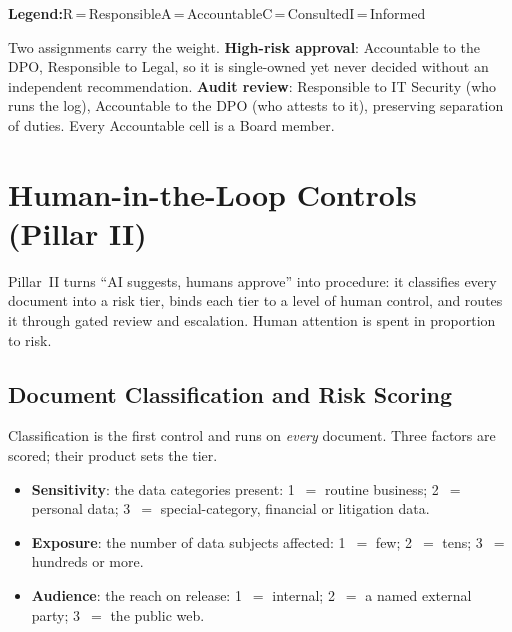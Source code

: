 \documentclass[12pt,a4paper]{article}
\begin{document}
\begin{tcolorbox}[
  enhanced, sharp corners, colback=white, colframe=gray!45, boxrule=0.5pt,
  left=8pt, right=8pt, top=5pt, bottom=5pt,
]
\textbf{Legend:}\quad R\,=\,Responsible\quad A\,=\,Accountable\quad C\,=\,Consulted\quad I\,=\,Informed
\end{tcolorbox}

Two assignments carry the weight. \textbf{High-risk approval}: Accountable to the DPO, Responsible to Legal, so it is single-owned yet never decided without an independent recommendation. \textbf{Audit review}: Responsible to IT Security (who runs the log), Accountable to the DPO (who attests to it), preserving separation of duties. Every Accountable cell is a Board member.

\section{Human-in-the-Loop Controls (Pillar II)}
\label{sec:hitl}

Pillar~II turns ``AI suggests, humans approve'' into procedure: it classifies every document into a risk tier, binds each tier to a level of human control, and routes it through gated review and escalation. Human attention is spent in proportion to risk.

\subsection{Document Classification and Risk Scoring}

Classification is the first control and runs on \emph{every} document. Three factors are scored; their product sets the tier.

\begin{definitionbox}[Risk Score $=$ Sensitivity $\times$ Exposure $\times$ Audience]
\begin{itemize}
  \item \textbf{Sensitivity}: the data categories present: 1~$=$ routine business; 2~$=$ personal data; 3~$=$ special-category, financial or litigation data.
  \item \textbf{Exposure}: the number of data subjects affected: 1~$=$ few; 2~$=$ tens; 3~$=$ hundreds or more.
  \item \textbf{Audience}: the reach on release: 1~$=$ internal; 2~$=$ a named external party; 3~$=$ the public web.
\end{itemize}
\end{definitionbox}
\end{document}
